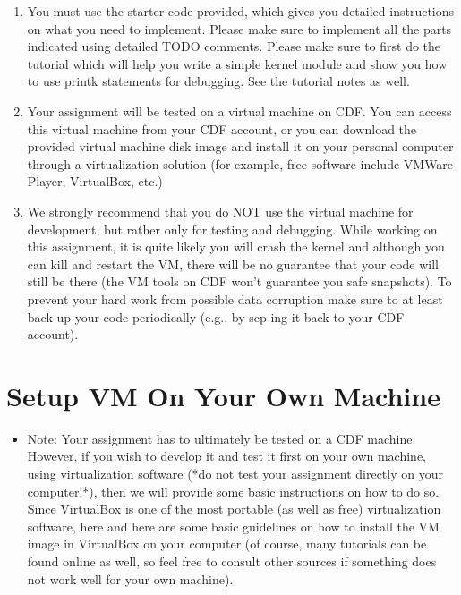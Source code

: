 \documentclass[12pt]{article}
\begin{document}
\begin{enumerate}[1.]
    \item You must use the starter code provided, which gives you detailed
    instructions on what you need to implement. Please make sure to implement all
    the parts indicated using detailed TODO comments. Please make sure to first do
    the tutorial which will help you write a simple kernel module and show you how
    to use printk statements for debugging. See the tutorial notes as well.
    \item Your assignment will be tested on a virtual machine on CDF. You can access
    this virtual machine from your CDF account, or you can download the provided
    virtual machine disk image and install it on your personal computer through
    a virtualization solution (for example, free software include VMWare Player,
    VirtualBox, etc.)
    \item We strongly recommend that you do NOT use the virtual machine for
    development, but rather only for testing and debugging. While working
    on this assignment, it is quite likely you will crash the kernel and although
    you can kill and restart the VM, there will be no guarantee that your code
    will still be there (the VM tools on CDF won't guarantee you safe snapshots).
    To prevent your hard work from possible data corruption make sure to at least
    back up your code periodically (e.g., by scp-ing it back to your CDF account).
\end{enumerate}

\section{Setup VM On Your Own Machine}

\bigskip

\begin{itemize}
    \item

    Note: Your assignment has to ultimately be tested on a CDF machine. However,
    if you wish to develop it and test it first on your own machine, using
    virtualization software (*do not test your assignment directly on your
    computer!*), then we will provide some basic instructions on how to do so.
    Since VirtualBox is one of the most portable (as well as free) virtualization
    software, here and here are some basic guidelines on how to install the VM
    image in VirtualBox on your computer (of course, many tutorials can be found
    online as well, so feel free to consult other sources if something does not
    work well for your own machine).
\end{itemize}
\end{document}
